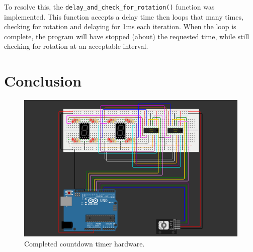 \documentclass[fleqn]{article}
\begin{document}
\vspace{0.15cm}
To resolve this, the \verb|delay_and_check_for_rotation()| function was implemented. This function accepts a delay time then loops that many times, checking for rotation and delaying for 1ms each iteration. When the loop is complete, the program will have stopped (about) the requested time, while still checking for rotation at an acceptable interval.

\section*{Conclusion}
    \begin{figure}[H]
        \centering
        \includegraphics[width=5in]{circut.png}
        \caption{Completed countdown timer hardware.}
    \end{figure}
\end{document}
